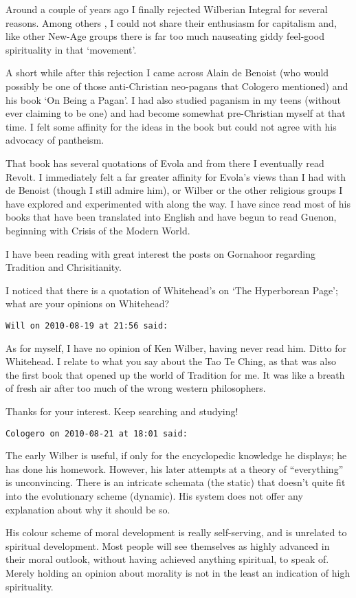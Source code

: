 \begin{footnotesize}
\begin{sffamily}
Around a couple of years ago I finally rejected Wilberian Integral for several reasons. Among others , I could not share
their enthusiasm for capitalism and, like other New-Age groups there is far too much nauseating giddy feel-good
spirituality in that ‘movement’.

A short while after this rejection I came across Alain de Benoist (who would possibly be one of those anti-Christian
neo-pagans that Cologero mentioned) and his book ‘On Being a Pagan’. I had also studied
paganism in my teens (without ever claiming to be one) and had become somewhat pre-Christian myself at that time. I
felt some affinity for the ideas in the book but could not agree with his advocacy of pantheism. 

That book has several quotations of Evola and from there I eventually read Revolt. I immediately felt a far greater
affinity for Evola's views than I had with de Benoist (though I still admire him), or Wilber or the other
religious groups I have explored and experimented with along the way. I have since read most of his books that have
been translated into English and have begun to read Guenon, beginning with Crisis of the Modern World.

I have been reading with great interest the posts on Gornahoor regarding Tradition and Chrisitianity.

I noticed that there is a quotation of Whitehead's on ‘The Hyperborean Page’; what
are your opinions on Whitehead?

\hfill

\texttt{Will on 2010-08-19 at 21:56 said: }

As for myself, I have no opinion of Ken Wilber, having never read him. Ditto for Whitehead. I relate to what you say
about the Tao Te Ching, as that was also the first book that opened up the world of Tradition for me. It was like a
breath of fresh air after too much of the wrong western philosophers.

Thanks for your interest. Keep searching and studying!

\hfill

\texttt{Cologero on 2010-08-21 at 18:01 said: }

The early Wilber is useful, if only for the encyclopedic knowledge he displays; he has done his homework. However, his
later attempts at a theory of “everything” is unconvincing. There is an intricate schemata (the static) that
doesn't quite fit into the evolutionary scheme (dynamic). His system does not offer any explanation about
why it should be so.

His colour scheme of moral development is really self-serving, and is unrelated to spiritual development. Most people
will see themselves as highly advanced in their moral outlook, without having achieved anything spiritual, to speak of.
Merely holding an opinion about morality is not in the least an indication of high spirituality.

\end{sffamily}\end{footnotesize}
